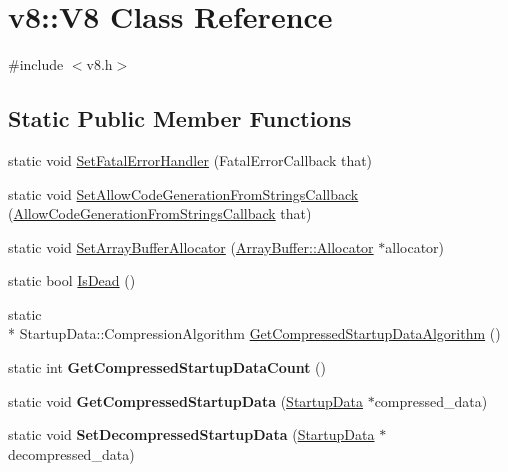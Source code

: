 \hypertarget{classv8_1_1V8}{\section{v8\-:\-:V8 Class Reference}
\label{classv8_1_1V8}
}


{\ttfamily \#include $<$v8.\-h$>$}

\subsection*{Static Public Member Functions}
\begin{DoxyCompactItemize}
\item 
static void \hyperlink{classv8_1_1V8_ab386f81a6d58dcf481d00446e8d15c9e}{Set\-Fatal\-Error\-Handler} (Fatal\-Error\-Callback that)
\item 
static void \hyperlink{classv8_1_1V8_ad4abec314050af6e68df3a339634293e}{Set\-Allow\-Code\-Generation\-From\-Strings\-Callback} (\hyperlink{namespacev8_ac236e6d6b2b45dd69a3fa4408d63353f}{Allow\-Code\-Generation\-From\-Strings\-Callback} that)
\item 
static void \hyperlink{classv8_1_1V8_abc40950a39f8cb6946dc8a1ad41eea84}{Set\-Array\-Buffer\-Allocator} (\hyperlink{classv8_1_1ArrayBuffer_1_1Allocator}{Array\-Buffer\-::\-Allocator} $\ast$allocator)
\item 
static bool \hyperlink{classv8_1_1V8_a0d5593ecf0d41035e4d9ee512119f0b7}{Is\-Dead} ()
\item 
static \\*
Startup\-Data\-::\-Compression\-Algorithm \hyperlink{classv8_1_1V8_a6d1b72d0cecdc64d0a0b8e784025b625}{Get\-Compressed\-Startup\-Data\-Algorithm} ()
\item 
\hypertarget{classv8_1_1V8_ab598cfc79ebbc85fdeb2171b84ce53e6}{static int {\bfseries Get\-Compressed\-Startup\-Data\-Count} ()}\label{classv8_1_1V8_ab598cfc79ebbc85fdeb2171b84ce53e6}

\item 
\hypertarget{classv8_1_1V8_a736d6ddfdbbd72ca5838f931002334df}{static void {\bfseries Get\-Compressed\-Startup\-Data} (\hyperlink{classv8_1_1StartupData}{Startup\-Data} $\ast$compressed\-\_\-data)}\label{classv8_1_1V8_a736d6ddfdbbd72ca5838f931002334df}

\item 
\hypertarget{classv8_1_1V8_a46d5618689f239b70425b8d7917cebf5}{static void {\bfseries Set\-Decompressed\-Startup\-Data} (\hyperlink{classv8_1_1StartupData}{Startup\-Data} $\ast$decompressed\-\_\-data)}\label{classv8_1_1V8_a46d5618689f239b70425b8d7917cebf5}


\end{DoxyCompactItemize}
